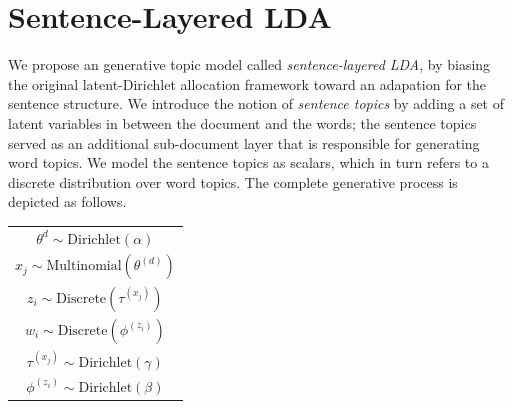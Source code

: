 \section{Sentence-Layered LDA} \label{s:sentence-layered-lda} We propose an
generative topic model called {\it sentence-layered LDA}, by biasing the
original latent-Dirichlet allocation framework toward an adapation {for} the
sentence structure.  We introduce the notion of {\it sentence topics} by adding
a set of latent variables in between the document and the words; the sentence
topics served as an additional sub-document layer that is responsible for
generating word topics.  We model the sentence topics as scalars, which in turn
refers to a discrete distribution over word topics.  The complete generative
process is depicted as follows.
\begin{table}[!ht]
  \footnotesize
  \centering
  \begin{tabular}{c}
    $\theta^{d} \sim \mathrm{Dirichlet}(\alpha)$ \\
    $x_j \sim \mathrm{Multinomial}(\theta^{(d)})$ \\
    $z_i \sim \mathrm{Discrete}(\tau^{(x_j)})$ \\
    $w_i \sim \mathrm{Discrete}(\phi^{(z_i)})$ \\
    $\tau^{(x_j)} \sim \mathrm{Dirichlet}(\gamma)$ \\
    $\phi^{(z_i)} \sim \mathrm{Dirichlet}(\beta)$ 
  \end{tabular}
\end{table}


